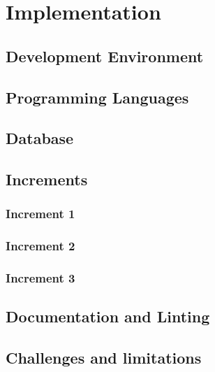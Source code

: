 \chapter{Implementation}
\label{chap:implementation}

\section{Development Environment}
\label{implementation:de}

\section{Programming Languages}
\label{implementation:languages}

\section{Database}
\label{implementation:db}

\section{Increments}
\label{implementation:increments}

\subsection{Increment 1}
\label{increments:1}

\subsection{Increment 2}
\label{increments:2}

\subsection{Increment 3}
\label{increments:3}

\section{Documentation and Linting}
\label{implementation:docs-and-linting}

\section{Challenges and limitations}
\label{implementation:challenges-limitations}
